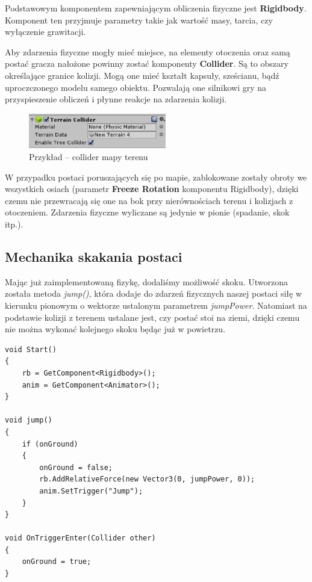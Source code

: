 \documentclass[openright]{xmgr}
\newcommand{\name}[1]{\textbf{\textcolor{NavyBlue}{#1}}}
\begin{document}
      Podstawowym komponentem zapewniającym obliczenia fizyczne jest \name{Rigidbody}. Komponent ten przyjmuje parametry takie jak wartość masy, tarcia, czy wyłączenie grawitacji.

      Aby zdarzenia fizyczne mogły mieć miejsce, na elementy otoczenia oraz samą postać gracza nałożone powinny zostać komponenty \name{Collider}. Są to obszary określające granice kolizji. Mogą one mieć kształt kapsuły, sześcianu, bądź uproczczonego modelu samego obiektu. Pozwalają one silnikowi gry na przyspieszenie obliczeń i płynne reakcje na zdarzenia kolizji.

      \begin{figure}[H]
      \center
      \includegraphics[width=6cm]{fizyka_1.png}
      \caption{Przykład -- collider mapy terenu}
      \end{figure}

      W przypadku postaci poruszających się po mapie, zablokowane zostały obroty we wszystkich osiach (parametr \name{Freeze Rotation} komponentu Rigidbody), dzięki czemu nie przewracają się one na bok przy nierównościach terenu i kolizjach z otoczeniem. Zdarzenia fizyczne wyliczane są jedynie w pionie (spadanie, skok itp.).

      \subsection{Mechanika skakania postaci}

          Mając już zaimplementowaną fizykę, dodaliśmy możliwość skoku. Utworzona została metoda \textit{jump()}, która dodaje do zdarzeń fizycznych naszej postaci siłę w kierunku pionowym o wektorze ustalonym parametrem \textit{jumpPower}. Natomiast na podstawie kolizji z terenem ustalane jest, czy postać stoi na ziemi, dzięki czemu nie można wykonać kolejnego skoku będąc już w powietrzu.

\begin{minipage}{\textwidth}
\begin{lstlisting}[caption={Fragment algorytmu skoku postaci}]
void Start()
{
    rb = GetComponent<Rigidbody>();
    anim = GetComponent<Animator>();
}

void jump()
{
    if (onGround)
    {
        onGround = false;
        rb.AddRelativeForce(new Vector3(0, jumpPower, 0));
        anim.SetTrigger("Jump");
    }
}

void OnTriggerEnter(Collider other)
{
    onGround = true;
}
\end{lstlisting}
\end{minipage}
\end{document}
